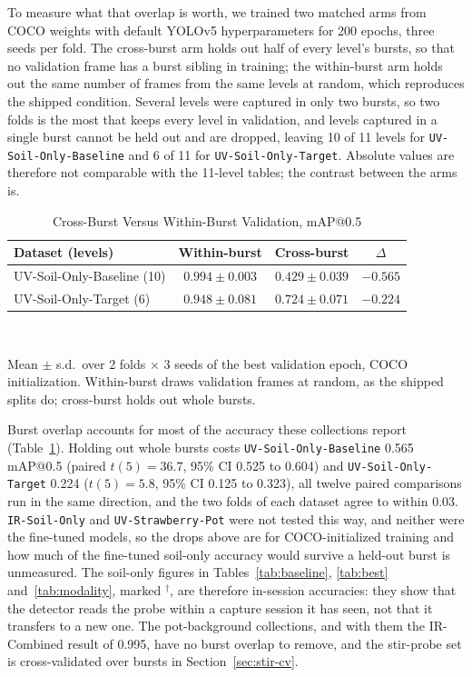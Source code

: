 ﻿\documentclass[journal]{IEEEtran}
\begin{document}
To measure what that overlap is worth, we trained two matched arms from COCO weights with default YOLOv5 hyperparameters for 200 epochs, three seeds per fold. The cross-burst arm holds out half of every level's bursts, so that no validation frame has a burst sibling in training; the within-burst arm holds out the same number of frames from the same levels at random, which reproduces the shipped condition. Several levels were captured in only two bursts, so two folds is the most that keeps every level in validation, and levels captured in a single burst cannot be held out and are dropped, leaving 10 of 11 levels for \texttt{UV-Soil-Only-Baseline} and 6 of 11 for \texttt{UV-Soil-Only-Target}. Absolute values are therefore not comparable with the 11-level tables; the contrast between the arms is.

\begin{table}[!t]
\renewcommand{\arraystretch}{1.3}
\caption{Cross-Burst Versus Within-Burst Validation, mAP@0.5}
\label{tab:burstcv}
\centering
\footnotesize
\setlength{\tabcolsep}{4pt}
\begin{tabular}{l c c c}
\toprule
\textbf{Dataset (levels)} & \textbf{Within-burst} & \textbf{Cross-burst} & \textbf{$\Delta$} \\
\midrule
UV-Soil-Only-Baseline (10) & $0.994 \pm 0.003$ & $0.429 \pm 0.039$ & $-0.565$ \\
UV-Soil-Only-Target (6) & $0.948 \pm 0.081$ & $0.724 \pm 0.071$ & $-0.224$ \\
\bottomrule
\end{tabular}
\\[2pt]
\parbox{\columnwidth}{\footnotesize Mean $\pm$ s.d.\ over 2 folds $\times$ 3 seeds of the best validation epoch, COCO initialization. Within-burst draws validation frames at random, as the shipped splits do; cross-burst holds out whole bursts.}
\end{table}

Burst overlap accounts for most of the accuracy these collections report (Table~\ref{tab:burstcv}). Holding out whole bursts costs \texttt{UV-Soil-Only-Baseline} 0.565 mAP@0.5 (paired $t(5) = 36.7$, 95\% CI 0.525 to 0.604) and \texttt{UV-Soil-Only-Target} 0.224 ($t(5) = 5.8$, 95\% CI 0.125 to 0.323), all twelve paired comparisons run in the same direction, and the two folds of each dataset agree to within 0.03. \texttt{IR-Soil-Only} and \texttt{UV-Strawberry-Pot} were not tested this way, and neither were the fine-tuned models, so the drops above are for COCO-initialized training and how much of the fine-tuned soil-only accuracy would survive a held-out burst is unmeasured. The soil-only figures in Tables~\ref{tab:baseline}, \ref{tab:best} and~\ref{tab:modality}, marked $^{\dagger}$, are therefore in-session accuracies: they show that the detector reads the probe within a capture session it has seen, not that it transfers to a new one. The pot-background collections, and with them the IR-Combined result of 0.995, have no burst overlap to remove, and the stir-probe set is cross-validated over bursts in Section~\ref{sec:stir-cv}.
\end{document}

